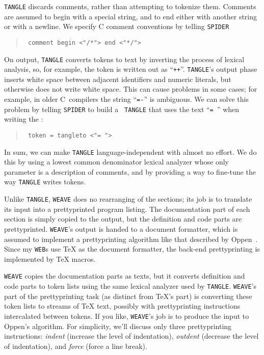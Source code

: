 {\tt TANGLE} discards comments, rather than attempting to tokenize
them.
Comments are assumed to begin with a special string, and to end either
with another string or with a newline.
We specify C comment conventions by telling {\tt SPIDER}
\begin{quote}\tt
comment begin <"/*"> end <"*/">
\end{quote}


On output, {\tt TANGLE} converts tokens to text by inverting the
process of lexical analysis, so, for example, the token \token{++} is
written out as ``{\tt ++}''.
{\tt TANGLE}'s output phase inserts white space between adjacent
identifiers and numeric literals, but otherwise does not write white
space.
This can cause problems in some cases; for example, in older
C~compilers the string 
``{\tt =-}'' is ambiguous.
We can solve this problem by telling {\tt SPIDER} to build a {\tt
TANGLE} that uses the text 
 ``{\tt =~}'' when writing the \token{=}:
\begin{quote}\tt
token = tangleto <"= ">
\end{quote}

In sum, we can make {\tt TANGLE} language-independent with almost no
effort.
We do this by using a lowest common denominator lexical analyzer whose
only parameter is a description of comments, and by providing a way to
fine-tune the way {\tt TANGLE} writes tokens.



\medskip
Unlike {\tt TANGLE}, {\tt WEAVE} does no rearranging of the sections;
its job is to translate its input into a prettyprinted program
listing.
The documentation part of each section is simply copied to the output,
but the definition and code parts are prettyprinted.
{\tt WEAVE}'s output is handed to a document formatter, which is
assumed to implement a prettyprinting algorithm like that described by
Oppen~\cite{oppen:prettyprinting}.
Since my {\tt WEB}s use {\TeX} as the document formatter, the back-end
prettyprinting is implemented by {\TeX} macros.

{\tt WEAVE} copies the documentation parts as texts, but it converts
definition and code parts to token lists using the same lexical
analyzer used by {\tt TANGLE}.
{\tt WEAVE}'s part of the prettyprinting task (as distinct from
{\TeX}'s part) is converting these token lists to streams of {\TeX}
text, possibly with prettyprinting instructions intercalated between
tokens. 
If you like, {\tt WEAVE}'s job is to produce the input to Oppen's
algorithm. 
For simplicity, we'll discuss only three prettyprinting instructions:
{\em indent} 
(increase the level of indentation), {\em outdent} (decrease the level
of indentation), and {\em force} (force a line break).


